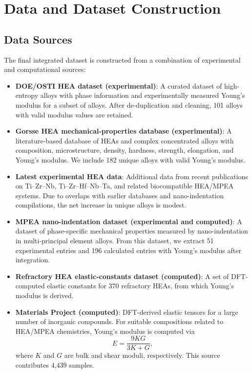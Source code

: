 \documentclass[11pt,a4paper]{article}
\begin{document}
\section{Data and Dataset Construction}

\subsection{Data Sources}

The final integrated dataset is constructed from a combination of experimental and computational sources:

\begin{itemize}
  \item \textbf{DOE/OSTI HEA dataset (experimental)}: A curated dataset of high-entropy alloys with phase information and experimentally measured Young's modulus for a subset of alloys. After de-duplication and cleaning, 101 alloys with valid modulus values are retained.
  \item \textbf{Gorsse HEA mechanical-properties database (experimental)}: A literature-based database of HEAs and complex concentrated alloys with composition, microstructure, density, hardness, strength, elongation, and Young's modulus. We include 182 unique alloys with valid Young's modulus.
  \item \textbf{Latest experimental HEA data}: Additional data from recent publications on Ti--Zr--Nb, Ti--Zr--Hf--Nb--Ta, and related biocompatible HEA/MPEA systems. Due to overlaps with earlier databases and nano-indentation compilations, the net increase in unique alloys is modest.
  \item \textbf{MPEA nano-indentation dataset (experimental and computed)}: A dataset of phase-specific mechanical properties measured by nano-indentation in multi-principal element alloys. From this dataset, we extract 51 experimental entries and 196 calculated entries with Young's modulus after integration.
  \item \textbf{Refractory HEA elastic-constants dataset (computed)}: A set of DFT-computed elastic constants for 370 refractory HEAs, from which Young's modulus is derived.
  \item \textbf{Materials Project (computed)}: DFT-derived elastic tensors for a large number of inorganic compounds. For suitable compositions related to HEA/MPEA chemistries, Young's modulus is computed via
  \begin{equation}
    E = \frac{9KG}{3K + G},
  \end{equation}
  where $K$ and $G$ are bulk and shear moduli, respectively. This source contributes 4{,}439 samples.
\end{itemize}
\end{document}
